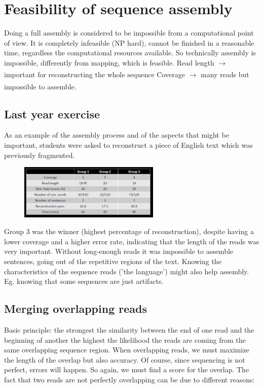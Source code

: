 \section{Feasibility of sequence assembly}

Doing a full assembly is considered to be impossible from a computational point of view. It is completely infeasible (NP hard), cannot be finished in a reasonable time, regardless the computational resources available. So technically assembly is impossible, differently from mapping, which is feasible. 
Read length $\xrightarrow[]{}$ important for reconstructing the whole sequence
Coverage $\xrightarrow[]{}$ many reads but impossible to assemble.

\subsection{Last year exercise}

As an example of the assembly process and of the aspects that might be important, students were asked to reconstruct a piece of English text which was previously fragmented.

\begin{figure}[h]
\centering
\includegraphics[width=0.6\textwidth]{Feasibility.png}
\caption{}
\end{figure}

Group 3 was the winner (highest percentage of reconstruction), despite having a lower coverage and a higher error rate, indicating that the length of the reads was very important. Without long-enough reads it was impossible to assemble sentences, going out of the repetitive regions of the text.
Knowing the characteristics of the sequence reads ('the language') might also help assembly. Eg. knowing that some sequences are just artifacts.

\subsection{Merging overlapping reads}

Basic principle: the strongest the similarity between the end of one read and the beginning of another the highest the likelihood the reads are coming from the same overlapping sequence region.
When overlapping reads, we must maximize the length of the overlap but also accuracy. Of course, since sequencing is not perfect, errors will happen. So again, we must find a score for the overlap. The fact that two reads are not perfectly overlapping can be due to different reasons:

